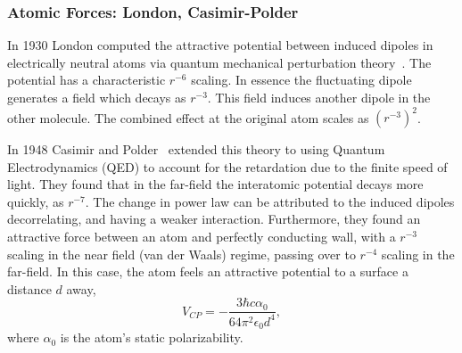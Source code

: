 \subsubsection{Atomic Forces: London, Casimir-Polder}

In 1930 London computed the attractive potential between induced dipoles in electrically neutral
atoms via quantum mechanical perturbation theory~\cite{London1930}.  The potential has a characteristic $r^{-6}$ scaling.
In essence the fluctuating dipole generates a field which decays as $r^{-3}$.  This field induces another
dipole in the other molecule.  The combined effect at the original atom scales as $(r^{-3})^2$.  

In 1948 Casimir and Polder~\cite{CasimirPolder1948} extended this theory to using Quantum Electrodynamics
(QED) to account for the retardation due to the finite speed of light.  They found that in the 
far-field the interatomic potential decays more quickly, as $r^{-7}$.  The change in power law can be 
attributed to the induced dipoles decorrelating, and having a weaker interaction.  Furthermore,
they found an attractive force between an atom and perfectly conducting wall, with a $r^{-3}$ scaling
in the near field (van der Waals) regime, passing over to $r^{-4}$ scaling in the far-field.    
In this case, the atom feels an attractive potential to a surface a distance $d$ away,
\begin{equation}
  V_{CP} =-\frac{3\hbar c\alpha_0}{64\pi^2\epsilon_0 d^4},
\end{equation}
where $\alpha_0$ is the atom's static polarizability.  

